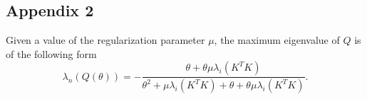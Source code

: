\documentclass[letterpaper]{article} %
\begin{document}



 \subsection*{Appendix 2}
Given a value of the regularization parameter $\mu$, the maximum eigenvalue of $Q$ is of the following form
\begin{equation*}
	\lambda_n(Q(\theta)) =- \frac{\theta +\theta\mu \lambda_i(K^T K) }{\theta^2+\mu \lambda_i(K^T K) +\theta +\theta\mu \lambda_i(K^T K)}.
\end{equation*}
\end{document}
